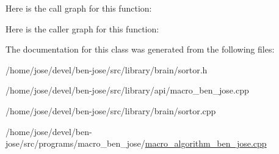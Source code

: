 Here is the call graph for this function\+:




Here is the caller graph for this function\+:




The documentation for this class was generated from the following files\+:\begin{DoxyCompactItemize}
\item 
/home/jose/devel/ben-\/jose/src/library/brain/sortor.\+h\item 
/home/jose/devel/ben-\/jose/src/library/api/macro\+\_\+ben\+\_\+jose.\+cpp\item 
/home/jose/devel/ben-\/jose/src/library/brain/sortor.\+cpp\item 
/home/jose/devel/ben-\/jose/src/programs/macro\+\_\+ben\+\_\+jose/\hyperlink{macro__algorithm__ben__jose_8cpp}{macro\+\_\+algorithm\+\_\+ben\+\_\+jose.\+cpp}\end{DoxyCompactItemize}
